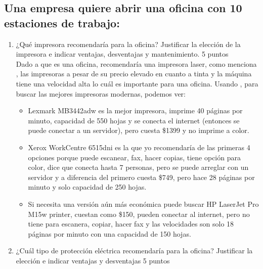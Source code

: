 \documentclass[stu, 12pt, letterpaper, donotrepeattitle, floatsintext, natbib, helv]{apa7}
\begin{document}
\subsection*{Una empresa quiere abrir una oficina con 10 estaciones de trabajo:}
{}

\begin{enumerate}
    \item ¿Qué impresora recomendaría para la oficina? Justificar la elección de la impresora e indicar ventajas, desventajas y mantenimiento. 5 puntos \\
    Dado a que es una oficina, recomendaría una impresora laser, como menciona , las impresoras a pesar de su precio elevado en cuanto a tinta y la máquina tiene una velocidad alta lo cuál es importante para una oficina. Usando \cite{laserPrinters}, para buscar las mejores impresoras modernas, podemos ver: \begin{itemize}
        \item Lexmark MB3442adw es la mejor impresora, imprime 40 páginas por minuto, capacidad de 550 hojas y se conecta el internet (entonces se puede conectar a un servidor), pero cuesta \$1399 y no imprime a color.
        \item Xerox WorkCentre 6515dni es la que yo recomendaría de las primeras 4 opciones porque puede escanear, fax, hacer copias, tiene opción para color, dice que conecta hasta 7 personas, pero se puede arreglar con un servidor y a diferencia del primero cuesta \$749, pero hace 28 páginas por minuto y solo capacidad de 250 hojas.
        \item Si necesita una versión aún más económica puede buscar HP LaserJet Pro M15w printer, cuestan como \$150, pueden conectar al internet, pero no tiene para escanera, copiar, hacer fax y las velocidades son solo 18 páginas por minuto con una capacidad de 150 hojas.
    \end{itemize}
    \item ¿Cuál tipo de protección eléctrica recomendaría para la oficina? Justificar la elección e indicar ventajas y desventajas 5 puntos \\ 

\end{enumerate}
\end{document}
